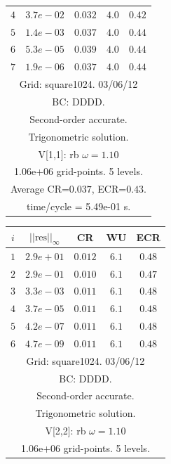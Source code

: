 \begin{table}[hbt]
\begin{center}
{\begin{tabular}{|c|c|c|c|c|}
 $ 4$  & $ 3.7e-02$ & $0.032$ & $ 4.0$ & $0.42$ \\ 
 $ 5$  & $ 1.4e-03$ & $0.037$ & $ 4.0$ & $0.44$ \\ 
 $ 6$  & $ 5.3e-05$ & $0.039$ & $ 4.0$ & $0.44$ \\ 
 $ 7$  & $ 1.9e-06$ & $0.037$ & $ 4.0$ & $0.44$ \\ 
\hline 
\multicolumn{5}{|c|}{Grid: square1024. 03/06/12}  \\
\multicolumn{5}{|c|}{BC: DDDD.}  \\
\multicolumn{5}{|c|}{Second-order accurate.}  \\
\multicolumn{5}{|c|}{Trigonometric solution.}  \\
\multicolumn{5}{|c|}{V[1,1]: rb $\omega=1.10$}  \\
\multicolumn{5}{|c|}{1.06e+06 grid-points. 5 levels.}  \\
\multicolumn{5}{|c|}{Average CR=$0.037$, ECR=$0.43$.}  \\
\multicolumn{5}{|c|}{time/cycle = 5.49e-01 s.}  \\
\hline 
\end{tabular}
\begin{tabular}{|c|c|c|c|c|} \hline 
 $i$   & $\vert\vert\mbox{res}\vert\vert_\infty$  &  CR     &  WU    & ECR  \\   \hline 
 $ 1$  & $ 2.9e+01$ & $0.012$ & $ 6.1$ & $0.48$ \\ 
 $ 2$  & $ 2.9e-01$ & $0.010$ & $ 6.1$ & $0.47$ \\ 
 $ 3$  & $ 3.3e-03$ & $0.011$ & $ 6.1$ & $0.48$ \\ 
 $ 4$  & $ 3.7e-05$ & $0.011$ & $ 6.1$ & $0.48$ \\ 
 $ 5$  & $ 4.2e-07$ & $0.011$ & $ 6.1$ & $0.48$ \\ 
 $ 6$  & $ 4.7e-09$ & $0.011$ & $ 6.1$ & $0.48$ \\ 
\hline 
\multicolumn{5}{|c|}{Grid: square1024. 03/06/12}  \\
\multicolumn{5}{|c|}{BC: DDDD.}  \\
\multicolumn{5}{|c|}{Second-order accurate.}  \\
\multicolumn{5}{|c|}{Trigonometric solution.}  \\
\multicolumn{5}{|c|}{V[2,2]: rb $\omega=1.10$}  \\
\multicolumn{5}{|c|}{1.06e+06 grid-points. 5 levels.}  \\

\end{tabular}}
\end{center}
\end{table}
